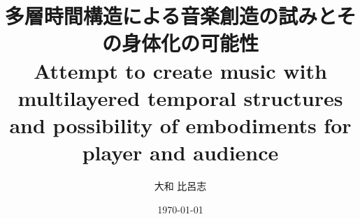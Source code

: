 \documentclass[uplatex,dvipdfmx]{ujarticle}
\title{\Large 多層時間構造による音楽創造の試みとその身体化の可能性 \\
Attempt to create music with multilayered temporal structures and possibility of embodiments for player and audience \\}
\author{大和 比呂志}
\date{\today}
\begin{document}
\maketitle
\large

%


%
%
%
\end{document}
